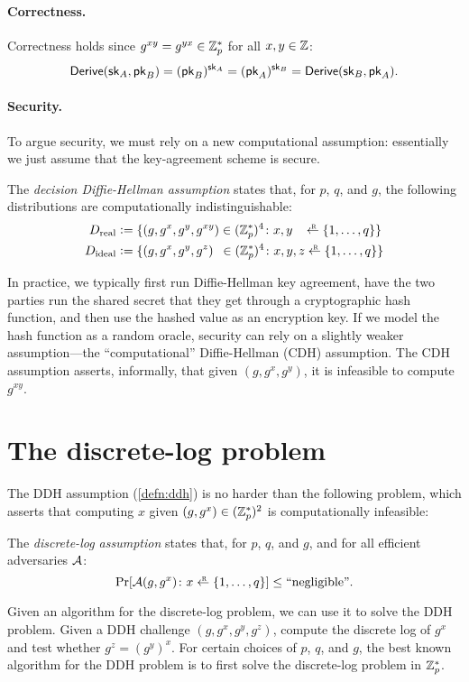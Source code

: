 \paragraph{Correctness.}
Correctness holds since $g^{xy}=g^{yx} \in \mathbb{Z}^*_p$ for all $x,y \in \mathbb{Z}$:
\begin{align*}
  \mathsf{Derive}({\mathsf{sk}}_A, \mathsf{pk}_B) = (\mathsf{pk}_B)^{{\mathsf{sk}}_A} = (\mathsf{pk}_A)^{{\mathsf{sk}}_B} = \mathsf{Derive}({\mathsf{sk}}_B, \mathsf{pk}_A).
\end{align*}


\paragraph{Security.}
To argue security, we must rely on a new computational assumption:
essentially we just assume that the key-agreement scheme is secure.

\begin{definition}\label{defn:ddh}
The \emph{decision Diffie-Hellman assumption} states that,
for $p$, $q$, and $g$, the following distributions are 
computationally indistinguishable:
  \begin{align*}
    D_\text{real} &\deq \{ (g, g^x, g^y, g^{xy}) \in (\Z^*_p)^4\colon x, y \,\,\,\,\,\getsr \{1, \dots, q\}\}\\
    D_\text{ideal} &\deq \{ (g, g^x, g^y, g^z) \,\,\,\in (\Z^*_p)^4 \colon x, y, z \getsr \{1, \dots, q\}\}
  \end{align*}
\end{definition}

In practice, we typically first run Diffie-Hellman key
agreement, have the two parties run the
shared secret that they get through a cryptographic hash function, 
and then use the hashed value as an encryption key.
If we model the hash function as a random oracle, security can rely
on a slightly weaker assumption---the ``computational'' Diffie-Hellman
(CDH) assumption.
The CDH assumption asserts, informally, that given $(g, g^x, g^y)$, it is
infeasible to compute $g^{xy}$.


\section{The discrete-log problem}
The DDH assumption (\cref{defn:ddh}) is no harder than the following
problem, which asserts that computing $x$ given $(g, g^x) \in (\mathbb{Z}_p^*)^2$
is computationally infeasible:
\begin{definition}
The \emph{discrete-log assumption} states that,
for $p$, $q$, and $g$, and for all efficient 
adversaries $\mathcal{A}$:
  \[ \Pr[\calA(g, g^x) \colon x \getsr \{1, \dots, q\} ] \leq \text{``negligible''}.\]
\end{definition}
Given an algorithm for the discrete-log problem, we can use it to solve the DDH problem.
Given a DDH challenge $(g, g^x, g^y, g^{z})$, compute the discrete log of $g^x$ and
test whether $g^z = {(g^y)}^x$.
For certain choices of $p$, $q$, and $g$, the best known algorithm for the DDH problem
is to first solve the discrete-log problem in $\mathbb{Z}^*_p$.

